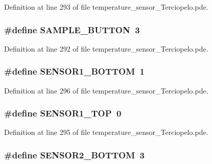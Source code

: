 Definition at line 293 of file temperature\_\-sensor\_\-Terciopelo.pde.\hypertarget{temperature__sensor___terciopelo_8pde_b2de299215608c2a35f0feb86adc2f6f}{
\subsubsection[{SAMPLE\_\-BUTTON}]{\setlength{\rightskip}{0pt plus 5cm}\#define SAMPLE\_\-BUTTON~3}}
\label{temperature__sensor___terciopelo_8pde_b2de299215608c2a35f0feb86adc2f6f}




Definition at line 292 of file temperature\_\-sensor\_\-Terciopelo.pde.\hypertarget{temperature__sensor___terciopelo_8pde_0da2a51dcb3e00b10aedd07d75f22382}{
\subsubsection[{SENSOR1\_\-BOTTOM}]{\setlength{\rightskip}{0pt plus 5cm}\#define SENSOR1\_\-BOTTOM~1}}
\label{temperature__sensor___terciopelo_8pde_0da2a51dcb3e00b10aedd07d75f22382}




Definition at line 296 of file temperature\_\-sensor\_\-Terciopelo.pde.\hypertarget{temperature__sensor___terciopelo_8pde_2a2946288d28852ba343b09fd4f17d7a}{
\subsubsection[{SENSOR1\_\-TOP}]{\setlength{\rightskip}{0pt plus 5cm}\#define SENSOR1\_\-TOP~0}}
\label{temperature__sensor___terciopelo_8pde_2a2946288d28852ba343b09fd4f17d7a}




Definition at line 295 of file temperature\_\-sensor\_\-Terciopelo.pde.\hypertarget{temperature__sensor___terciopelo_8pde_df66e6da6cf8c78004dc0a75fd14d3b1}{
\subsubsection[{SENSOR2\_\-BOTTOM}]{\setlength{\rightskip}{0pt plus 5cm}\#define SENSOR2\_\-BOTTOM~3}}
\label{temperature__sensor___terciopelo_8pde_df66e6da6cf8c78004dc0a75fd14d3b1}




